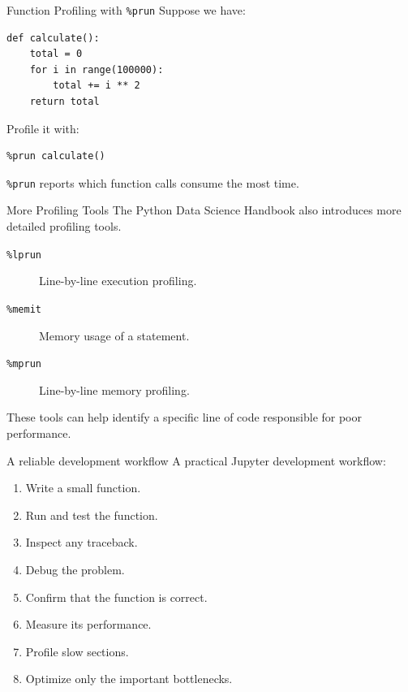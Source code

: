 \documentclass[11pt,aspectratio=43]{beamer}
\begin{document}
\begin{frame}[fragile]{Function Profiling with \texttt{\%prun}}
Suppose we have:

\begin{lstlisting}
def calculate():
    total = 0
    for i in range(100000):
        total += i ** 2
    return total
\end{lstlisting}

Profile it with:

\begin{lstlisting}
%prun calculate()
\end{lstlisting}

\texttt{\%prun} reports which function calls consume the most time.
\end{frame}

\begin{frame}{More Profiling Tools}
The Python Data Science Handbook also introduces more detailed profiling tools.

\begin{description}
  \item[\texttt{\%lprun}] Line-by-line execution profiling.
  \item[\texttt{\%memit}] Memory usage of a statement.
  \item[\texttt{\%mprun}] Line-by-line memory profiling.
\end{description}

\vspace{0.4cm}
These tools can help identify a specific line of code responsible for poor performance.
\end{frame}

\begin{frame}{A reliable development workflow}
A practical Jupyter development workflow:

\begin{enumerate}
  \item Write a small function.
  \item Run and test the function.
  \item Inspect any traceback.
  \item Debug the problem.
  \item Confirm that the function is correct.
  \item Measure its performance.
  \item Profile slow sections.
  \item Optimize only the important bottlenecks.
\end{enumerate}
\end{frame}
\end{document}
